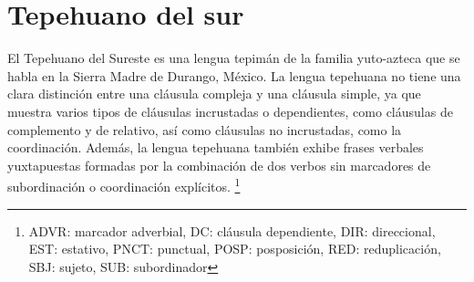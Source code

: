 \section*{Tepehuano del sur}

\noindent El Tepehuano del Sureste es una lengua tepimán de la familia yuto-azteca que se habla en la Sierra Madre de Durango, México. La lengua tepehuana no tiene una clara distinción entre una cláusula compleja y una cláusula simple, ya que muestra varios tipos de cláusulas incrustadas o dependientes, como cláusulas de complemento y de relativo, así como cláusulas no incrustadas, como la coordinación. Además, la lengua tepehuana también exhibe frases verbales yuxtapuestas formadas por la combinación de dos verbos sin marcadores de subordinación o coordinación explícitos. 
\footnote{ADVR: marcador adverbial, DC: cláusula dependiente, DIR: direccional, EST: estativo, PNCT: punctual, POSP: posposición, RED: reduplicación, SBJ: sujeto, SUB: subordinador}


\vspace{0.5cm}

